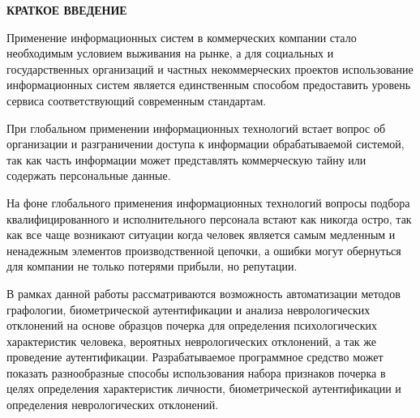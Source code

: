 \begin{center}
{\bfseries КРАТКОЕ ВВЕДЕНИЕ}
\end{center}
\label{sec:intro}

Применение информационных систем в коммерческих компании стало необходимым условием выживания на рынке, а для социальных и государственных организаций и частных некоммерческих проектов использование информационных систем является единственным способом предоставить уровень сервиса соответствующий современным стандартам. 

При глобальном применении информационных технологий встает вопрос об организации и разграничении доступа к информации обрабатываемой системой, так как часть информации может представлять коммерческую тайну или содержать персональные данные.

На фоне глобального применения информационных технологий вопросы подбора квалифицированного и исполнительного персонала встают как никогда остро, так как все чаще возникают ситуации когда человек является самым медленным и ненадежным элементов производственной цепочки, а ошибки могут обернуться для компании не только потерями прибыли, но репутации.

В рамках данной работы рассматриваются возможность автоматизации методов графологии, биометрической аутентификации и анализа неврологических отклонений на основе образцов почерка для определения психологических характеристик человека, вероятных неврологических отклонений, а так же проведение аутентификации.
Разрабатываемое программное средство может показать разнообразные способы использования набора признаков почерка в целях определения характеристик личности, биометрической аутентификации и определения неврологических отклонений.
\clearpage